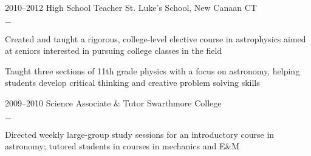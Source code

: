 \documentclass[]{luger-cv} %
\begin{document}
%
%
\begin{entrylist}


    \entry
    {2010--2012}
    {High School Teacher}
    {St. Luke's School, New Canaan CT}
    {%
        \vspace{-1em}
        \begin{list}{{\color{numcolor}$-$}}{\cvlist}
            \item Created and taught a rigorous, college-level elective course in astrophysics
                  aimed at seniors interested in pursuing college classes in the field
            \item Taught three sections of 11th grade physics with a focus on
                  astronomy, helping students develop critical thinking and creative
                  problem solving skills
        \end{list}
    }


    \entry
    {2009--2010}
    {Science Associate \& Tutor}
    {Swarthmore College}
    {%
        \vspace{-1em}
        \begin{list}{{\color{numcolor}$-$}}{\cvlist}
            \item Directed weekly large-group study sessions for an introductory course in
                    astronomy; tutored students in courses in mechanics and E\&M
        \end{list}
    }


\end{entrylist}

\end{document}
